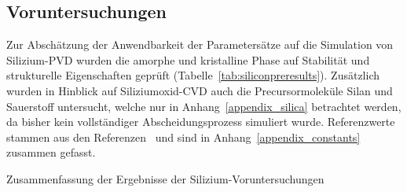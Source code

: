 \subsection{Voruntersuchungen}

Zur Abschätzung der Anwendbarkeit der Parametersätze auf die Simulation von Silizium-PVD wurden die amorphe und kristalline Phase auf Stabilität und strukturelle Eigenschaften geprüft (Tabelle~\ref{tab:siliconpreresults}).
Zusätzlich wurden in Hinblick auf Siliziumoxid-CVD auch die Precursormoleküle Silan und Sauerstoff untersucht, welche nur in Anhang~\ref{appendix_silica} betrachtet werden, da bisher kein vollständiger Abscheidungsprozess simuliert wurde.
Referenzwerte stammen aus den Referenzen~\cite{haynes_crc_2011,remes_optical_1998} und sind in Anhang~\ref{appendix_constants} zusammen gefasst.
\nopagebreak[4]
\begin{table}[th]
  \begin{threeparttable}
    \caption{Zusammenfassung der Ergebnisse der Silizium-Voruntersuchungen}
    \label{tab:siliconpreresults}


\end{threeparttable}
\end{table}
